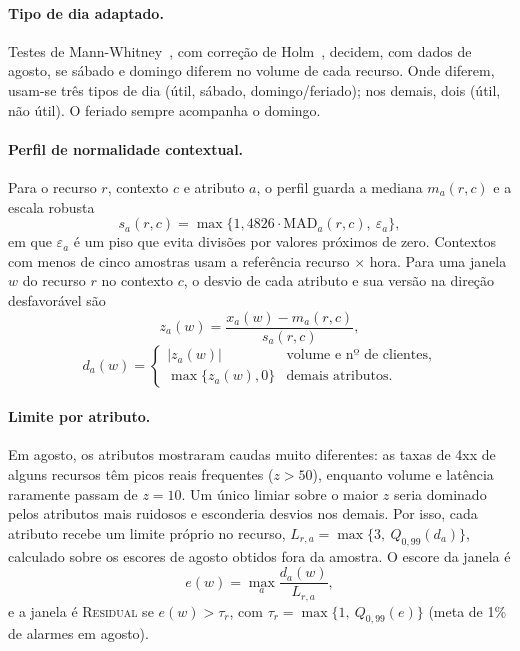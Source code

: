 \documentclass[sigconf,nonacm]{acmart}
\newcommand{\Residual}{\textsc{Residual}\xspace}
\begin{document}
\paragraph{Tipo de dia adaptado.} Testes de Mann-Whitney~\citep{mann1947test}, com correção de Holm~\citep{holm1979simple}, decidem, com dados de agosto, se sábado e domingo diferem no volume de cada recurso. Onde diferem, usam-se três tipos de dia (útil, sábado, domingo/feriado); nos demais, dois (útil, não útil). O feriado sempre acompanha o domingo.

\paragraph{Perfil de normalidade contextual.} Para o recurso $r$, contexto $c$ e atributo $a$, o perfil guarda a mediana $m_{a}(r,c)$ e a escala robusta~\citep{leys2013mad}
\begin{equation}
  s_{a}(r,c)=\max\{1{,}4826\cdot\mathrm{MAD}_{a}(r,c),\ \varepsilon_a\},
\end{equation}
em que $\varepsilon_a$ é um piso que evita divisões por valores próximos de zero. Contextos com menos de cinco amostras usam a referência recurso $\times$ hora. Para uma janela $w$ do recurso $r$ no contexto $c$, o desvio de cada atributo e sua versão na direção desfavorável são
\begin{equation}
  z_a(w)=\frac{x_a(w)-m_a(r,c)}{s_a(r,c)},
\end{equation}
\begin{equation}
  d_a(w)=\begin{cases}|z_a(w)| & \text{volume e nº de clientes,}\\ \max\{z_a(w),0\} & \text{demais atributos.}\end{cases}
\end{equation}

\paragraph{Limite por atributo.} Em agosto, os atributos mostraram caudas muito diferentes: as taxas de 4xx de alguns recursos têm picos reais frequentes ($z>50$), enquanto volume e latência raramente passam de $z=10$. Um único limiar sobre o maior $z$ seria dominado pelos atributos mais ruidosos e esconderia desvios nos demais. Por isso, cada atributo recebe um limite próprio no recurso, $L_{r,a}=\max\{3,\ Q_{0{,}99}(d_a)\}$, calculado sobre os escores de agosto obtidos fora da amostra. O escore da janela é
\begin{equation}
  e(w)=\max_a \frac{d_a(w)}{L_{r,a}},
\end{equation}
e a janela é \Residual se $e(w)>\tau_r$, com $\tau_r=\max\{1,\ Q_{0{,}99}(e)\}$ (meta de 1\% de alarmes em agosto).
\end{document}
